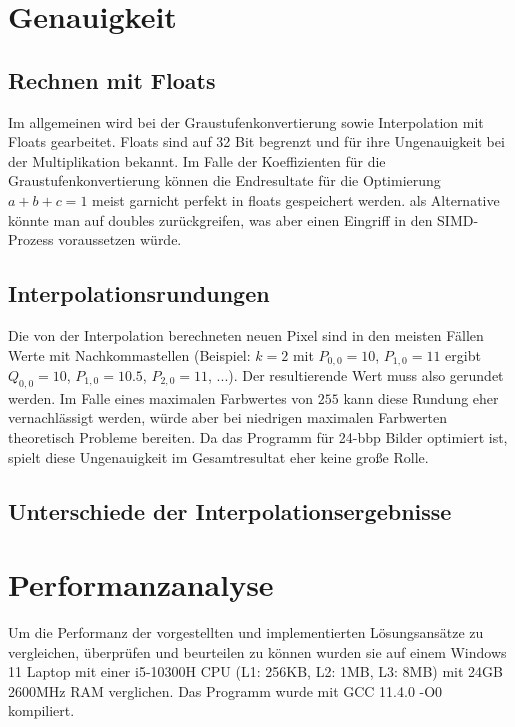 \documentclass[course=erap]{aspdoc}
\begin{document}
\section{Genauigkeit}
\subsection{Rechnen mit Floats}
Im allgemeinen wird bei der Graustufenkonvertierung sowie Interpolation mit Floats gearbeitet. Floats sind auf 32 Bit begrenzt und für ihre Ungenauigkeit bei der Multiplikation bekannt. Im Falle der Koeffizienten für die Graustufenkonvertierung können die Endresultate für die Optimierung $a + b + c = 1$ meist garnicht perfekt in floats gespeichert werden. als Alternative könnte man auf doubles zurückgreifen, was aber einen Eingriff in den SIMD-Prozess voraussetzen würde.


\subsection{Interpolationsrundungen}
Die von der Interpolation berechneten neuen Pixel sind in den meisten Fällen Werte mit Nachkommastellen (Beispiel: $k = 2$ mit $P_{0,0} = 10$, $P_{1,0} = 11$ ergibt $Q_{0,0} = 10$, $P_{1,0} = 10.5$, $P_{2,0} = 11$, $...$). Der resultierende Wert muss also gerundet werden. Im Falle eines maximalen Farbwertes von $255$ kann diese Rundung eher vernachlässigt werden, würde aber bei niedrigen maximalen Farbwerten theoretisch Probleme bereiten. Da das Programm für 24-bbp Bilder optimiert ist, spielt diese Ungenauigkeit im Gesamtresultat eher keine große Rolle.

\subsection{Unterschiede der Interpolationsergebnisse}



\section{Performanzanalyse}
Um die Performanz der vorgestellten und implementierten Lösungsansätze zu vergleichen, überprüfen und beurteilen zu können wurden sie auf einem Windows 11 Laptop mit einer i5-10300H CPU (L1: 256KB, L2: 1MB, L3: 8MB) mit 24GB 2600MHz RAM verglichen. Das Programm wurde mit GCC 11.4.0 -O0 kompiliert.
\end{document}
